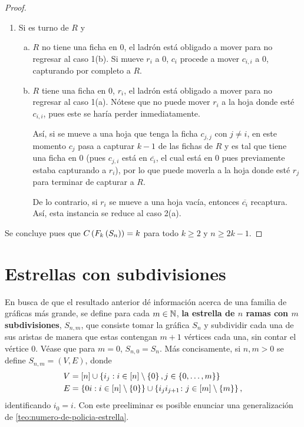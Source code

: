 \begin{proof}
\begin{enumerate}
        \item Si es turno de $R$ y
        \begin{enumerate}[(a)]
            \item $R$ no tiene una ficha en $0$, el ladr\'on est\'a obligado a
            mover para no regresar al caso 1(b). Si mueve $r_i$ a $0$, $c_i$
            procede a mover $c_{i,i}$ a $0$, capturando por completo a $R$.
            
            \item $R$ tiene una ficha en $0$, $r_i$, el ladr\'on est\'a obligado
            a mover para no regresar al caso 1(a). N\'otese que no puede mover
            $r_i$ a la hoja donde est\'e $c_{i,i}$, pues este se har\'ia perder
            inmediatamente.
            
            As\'i, si se mueve a una hoja que tenga la ficha $c_{j,j}$ con
            $j\neq i$, en este momento $c_j$ pasa a capturar $k-1$ de las fichas
            de $R$ y es tal que tiene una ficha en $0$ (pues $c_{j,i}$ est\'a en
            $\overline{c_i}$, el cual est\'a en $0$ pues previamente estaba
            capturando a $r_i$), por lo que puede moverla a la hoja donde est\'e
            $r_j$ para terminar de capturar a $R$.

            De lo contrario, si $r_i$ se mueve a una hoja vac\'ia, entonces
            $\overline{c_i}$ recaptura. As\'i, esta instancia se reduce al caso
            2(a).
        \end{enumerate}
    \end{enumerate}
    Se concluye pues que $C\left( F_k\left( S_n\right)\right)=k$ para todo $k\geq 2$ y
    $n\geq 2k-1$.
    
\end{proof}

\section{Estrellas con subdivisiones}

En busca de que el resultado anterior d\'e informaci\'on acerca de una familia
de gr\'aficas m\'as grande, se define para cada $m\in \mathbb{N}$, \textbf{la estrella
de $n$ ramas con $m$ subdivisiones}, $S_{n,m}$, que consiste tomar la gr\'afica
$S_n$ y subdividir cada una de sus aristas de manera que estas contengan $m+1$
v\'ertices cada una, sin contar el v\'ertice $0$. V\'ease que para $m=0$,
$S_{n,0}=S_n$. M\'as concisamente, si $n,m > 0$ se define $S_{n,m}=(V,E)$, donde
\begin{align*}
    V &=\left[ n\right]\cup\left\{ i_j: i\in\left[ n\right]\setminus \left\{ 0\right\} , j\in \left\{ 0,\dots, m\right\}\right\} \\
    E &=\left\{ 0i : i\in \left[ n\right]\setminus\left\{ 0\right\}\right\} \cup \left\{ i_ji_{j+1} \colon j \in \left[ m\right]
    \setminus\left\{ m\right\}\right\},
\end{align*}
identificando $i_0=i$. Con este preeliminar es posible enunciar una
generalizaci\'on de \cref{teo:numero-de-policia-estrella}.

